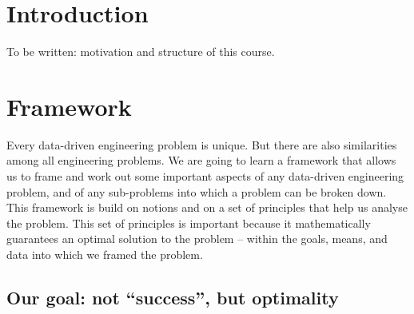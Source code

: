 \documentclass[
  a4paper,
  DIV=11,
  numbers=noendperiod,
  oneside]{scrreprt}
\begin{document}
\hypertarget{intro}{%
\chapter{Introduction}\label{intro}}

To be written: motivation and structure of this course.


\hypertarget{framework}{%
\chapter{Framework}\label{framework}}

\providecommand{\ul}{\uline}
\renewcommand*{\|}[1][]{\nonscript\:#1\vert\nonscript\:\mathopen{}}
\providecommand*{\pr}[1]{\textsf{\small`#1'}}
\renewcommand*{\pr}[1]{\textsf{\small`#1'}}
\providecommand*{\prq}[1]{\textsf{\small #1}}
\renewcommand*{\prq}[1]{\textsf{\small #1}}
\providecommand{\se}[1]{\mathsfit{#1}}
\renewcommand{\se}[1]{\mathsfit{#1}}
\providecommand{\p}{\mathrm{p}}
\renewcommand{\p}{\mathrm{p}}
\renewcommand{\P}{\mathrm{P}}

Every data-driven engineering problem is unique. But there are also
similarities among all engineering problems. We are going to learn a
framework that allows us to frame and work out some important aspects of
any data-driven engineering problem, and of any sub-problems into which
a problem can be broken down. This framework is build on notions and on
a set of principles that help us analyse the problem. This set of
principles is important because it mathematically guarantees an optimal
solution to the problem -- within the goals, means, and data into which
we framed the problem.

\hypertarget{our-goal-not-success-but-optimality}{%
\section{Our goal: not ``success'', but
optimality}\label{our-goal-not-success-but-optimality}}
\end{document}
